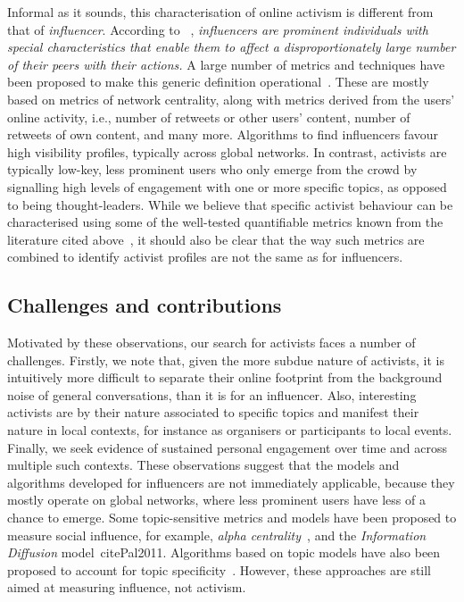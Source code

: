 \documentclass[runningheads]{llncs}
\begin{document}
Informal as it sounds, this characterisation of online activism is different from that of \textit{influencer}.
According to ~\cite{Kardara2015}, \textit{influencers are prominent individuals with special characteristics that enable them to	affect a disproportionately large number of their peers with their actions.}
A large number of metrics and techniques have been proposed to make this generic definition operational~\cite{RIQUELME2016949}. These are mostly based on metrics of network centrality, along with metrics derived from the users' online activity, i.e., number of retweets or other users' content, number of retweets of own content, and many more.
%
Algorithms to find influencers favour high visibility profiles, typically across global networks.
In contrast, activists are typically low-key, less prominent users who only emerge from the crowd by signalling high levels of engagement with one or more specific topics, as opposed to being thought-leaders.
%
While we believe that specific activist behaviour can be characterised using some of the well-tested quantifiable metrics known from the literature  cited above~\cite{RIQUELME2016949}, it should also be clear that the way such metrics are combined to identify activist profiles are not the same as for influencers. 

\subsection{Challenges and contributions}

Motivated by these observations, our search for activists faces a number of challenges.
%
Firstly, we note that, given the more subdue nature of activists, it is intuitively more difficult to separate their online footprint from the background noise of general conversations, than it is for an influencer.
Also, interesting activists are by their nature associated to specific topics and manifest their nature in local contexts, for instance as organisers or participants to local events. 
Finally, we seek evidence of sustained personal engagement over time and across multiple such contexts. 
These observations suggest that the models and algorithms developed for influencers are not immediately applicable, because they mostly operate on global networks, where less prominent users have less of a chance to emerge. 
Some topic-sensitive metrics and models have been proposed to measure social influence, for example, \textit{alpha centrality}~\cite{Bonacich2001,Overbey2013}, and the \textit{Information Diffusion} model~cite{Pal2011}. Algorithms based on topic models have also been proposed to account for topic specificity~\cite{Zhao2011b}.  However, these approaches are still aimed at measuring influence, not activism. 
\end{document}
